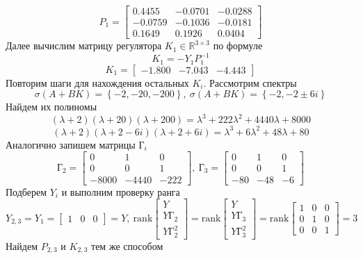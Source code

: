 \documentclass[a4paper, 12pt]{article}
\begin{document}
    $$
    P_1=\begin{bmatrix}
    0.4455   &-0.0701   &-0.0288\\
   -0.0759   &-0.1036   &-0.0181\\
    0.1649    &0.1926    &0.0404
    \end{bmatrix}
    $$
    Далее вычислим матрицу регулятора $K_1\in\mathbb{R}^{3\times3}$ по формуле
    $$K_1=-Y_1P_1^{-1}$$
    $$K_1=\begin{bmatrix}
        -1.800   &-7.043   &-4.443
    \end{bmatrix}$$
    Повторим шаги для нахождения остальных $K_i$. Рассмотрим спектры $$\sigma\left(A+BK\right)=\left\{-2,-20,-200\right\},\ \sigma\left(A+BK\right)=\left\{-2,-2\pm6i\right\}$$
    Найдем их полиномы
    $$\left(\lambda+2\right)\left(\lambda+20\right)\left(\lambda+200\right)=\lambda^3+222\lambda^2+4440\lambda+8000$$
    $$\left(\lambda+2\right)\left(\lambda+2-6i\right)\left(\lambda+2+6i\right)=\lambda^3+6\lambda^2+48\lambda+80$$
    Аналогично запишем матрицы $\text{Г}_i$
    $$\text{Г}_2=\begin{bmatrix}
        0 &1 &0\\
        0 &0 &1\\
        -8000 &-4440 &-222
    \end{bmatrix},\ \text{Г}_3=\begin{bmatrix}
        0 &1 &0\\
        0 &0 &1\\
        -80 &-48 &-6
    \end{bmatrix}$$
    Подберем $Y_i$ и выполним проверку ранга
    $$
    Y_{2,3}=Y_1=\begin{bmatrix}
        1 &0 &0
    \end{bmatrix}=Y,\
    \text{rank}\begin{bmatrix}
        Y\\
        Y\text{Г}_2\\
        Y\text{Г}_2^2
    \end{bmatrix}=\text{rank}\begin{bmatrix}
        Y\\
        Y\text{Г}_3\\
        Y\text{Г}_3^2
    \end{bmatrix}=\text{rank}\begin{bmatrix}
        1 &0 &0\\
        0 &1 &0\\
        0 &0 &1
    \end{bmatrix}=3
    $$
    Найдем $P_{2,3}$ и $K_{2,3}$ тем же способом
\end{document}
